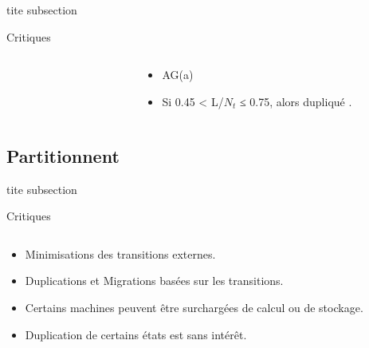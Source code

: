\begin{frame}{tite subsection}
\begin{block}{Critiques}
\begin{columns}
\begin{column}{0.3\textwidth}
\begin{figure}
			\end{figure}
		\end{column}
		\begin{column}{0.7\textwidth}
			\begin{itemize}
				\item AG(a)
				\item Si 0.45 < L/$N_t$ ≤ 0.75, alors dupliqué .
			\end{itemize}
		\end{column}
	\end{columns}
\end{block}
\end{frame}

\subsection{Partitionnent}
\begin{frame}{tite subsection}
\vspace{-10pt}
\begin{block}{Critiques}
	\vspace{-15pt}
	\begin{columns}
		\begin{column}{\textwidth}
			\begin{itemize}
				\item Minimisations des transitions externes.
				\item Duplications et Migrations basées sur les transitions.
				\item Certains machines peuvent être surchargées de calcul ou de stockage.
				\item Duplication de certains états est sans intérêt.%
			\end{itemize}
		\end{column}
	\end{columns}
	
\end{block}
\end{frame}
